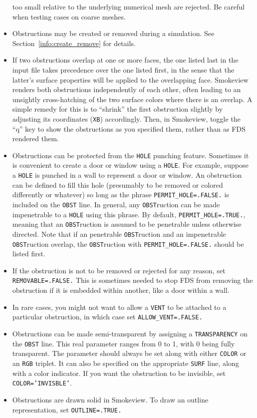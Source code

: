 \documentclass[11pt]{book}
\newcommand{\ct}{\tt\small}
\begin{document}
\begin{itemize}
too small relative to the underlying numerical mesh are rejected.
Be careful when testing cases on coarse meshes.
\item Obstructions may be created or removed during a simulation. See
Section~\ref{info:create_remove} for details.
\item If two obstructions overlap at one or more faces, the one listed last in the input file takes precedence over the one
listed first, in the sense that the latter's surface properties will be applied to the overlapping face. Smokeview renders both obstructions
independently of each other, often leading to an unsightly cross-hatching of the two surface colors where there is an overlap. A
simple remedy for this is to ``shrink'' the first obstruction slightly by adjusting its coordinates ({\ct XB}) accordingly. Then, in
Smokeview, toggle the ``q'' key to show the obstructions as you specified them, rather than as FDS rendered them.
\item Obstructions can be protected from the {\ct HOLE} punching feature. Sometimes
it is convenient to create a door or window using a {\ct HOLE}. For example, suppose a
{\ct HOLE} is punched in a wall to represent a door or window. An obstruction can be
defined to fill this hole (presumably to be removed or colored differently or whatever) so
long as the phrase {\ct PERMIT\_HOLE=.FALSE.} is included on the {\ct OBST} line. In general,
any {\ct OBST}ruction can be made impenetrable to a {\ct HOLE} using this phrase. By default,
{\ct PERMIT\_HOLE=.TRUE.}, meaning that an {\ct OBST}ruction is assumed to be penetrable unless otherwise directed. Note that if an penetrable  {\ct OBST}ruction
and an impenetrable  {\ct OBST}ruction overlap, the {\ct OBST}ruction with {\ct PERMIT\_HOLE=.FALSE.} should be listed first.
\item If the obstruction is not to be removed or rejected for any reason, set {\ct REMOVABLE=.FALSE.} This is sometimes needed to stop
FDS from removing the obstruction if it is embedded within another, like a door within a wall.
\item In rare cases, you might not want to allow a {\ct VENT} to be attached to a particular obstruction, in which case set
{\ct ALLOW\_VENT=.FALSE.}
\item Obstructions can be made semi-transparent by assigning a {\ct TRANSPARENCY} on the {\ct OBST} line. This real parameter ranges from
0 to 1, with 0 being fully transparent. The parameter should always be set along with either {\ct COLOR} or an {\ct RGB} triplet. It can
also be specified on the appropriate {\ct SURF} line, along with a color indicator. If you want the obstruction to be invisible, set {\ct COLOR='INVISBLE'}.
\item Obstructions are drawn solid in Smokeview. To draw an outline representation, set {\ct OUTLINE=.TRUE.}
\end{itemize}
\end{document}
